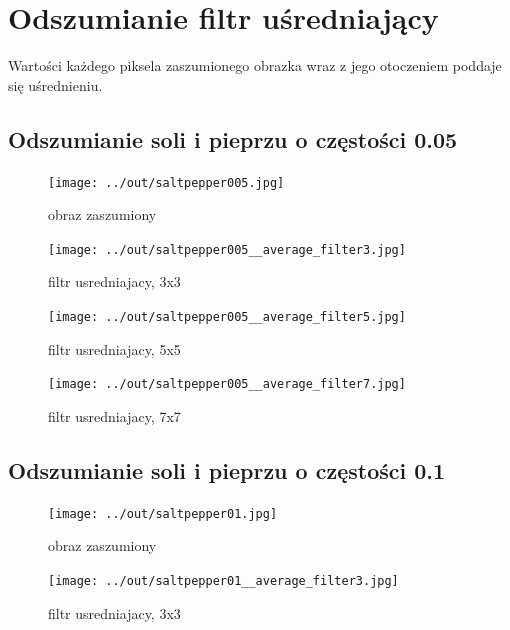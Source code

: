 \documentclass[a4paper,12pt]{article}
\begin{document}
\newpage
\section{Odszumianie filtr uśredniający}
Wartości każdego piksela zaszumionego obrazka wraz z jego otoczeniem poddaje się uśrednieniu.




\newpage
\subsection{Odszumianie soli i pieprzu o częstości 0.05}
\begin{figure}[h!]
\begin{minipage}[t]{7.5cm}
\begin{center}
\texttt{[image: ../out/saltpepper005.jpg]}
\caption{obraz zaszumiony}
\end{center}
\end{minipage}
\hfill
\begin{minipage}[t]{7.5cm}
\begin{center}
\texttt{[image: ../out/saltpepper005\_\_average\_filter3.jpg]}
\caption{filtr usredniajacy, 3x3}
\end{center}
\end{minipage}
\end{figure}

\begin{figure}[h!]
\begin{minipage}[t]{7.5cm}
\begin{center}
\texttt{[image: ../out/saltpepper005\_\_average\_filter5.jpg]}
\caption{filtr usredniajacy, 5x5}
\end{center}
\end{minipage}
\hfill
\begin{minipage}[t]{7.5cm}
\begin{center}
\texttt{[image: ../out/saltpepper005\_\_average\_filter7.jpg]}
\caption{filtr usredniajacy, 7x7}
\end{center}
\end{minipage}
\end{figure}


\newpage
\subsection{Odszumianie soli i pieprzu o częstości 0.1}
\begin{figure}[h!]
\begin{minipage}[t]{7.5cm}
\begin{center}
\texttt{[image: ../out/saltpepper01.jpg]}
\caption{obraz zaszumiony}
\end{center}
\end{minipage}
\hfill
\begin{minipage}[t]{7.5cm}
\begin{center}
\texttt{[image: ../out/saltpepper01\_\_average\_filter3.jpg]}
\caption{filtr usredniajacy, 3x3}
\end{center}
\end{minipage}
\end{figure}
\end{document}
